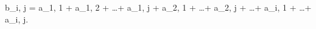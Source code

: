 b_{i, j} = a_{1, 1} + a_{1, 2} + \ldots + a_{1, j} + a_{2, 1} + \ldots + a_{2, j} + \ldots + a_{i, 1} + \ldots + a_{i, j}.
